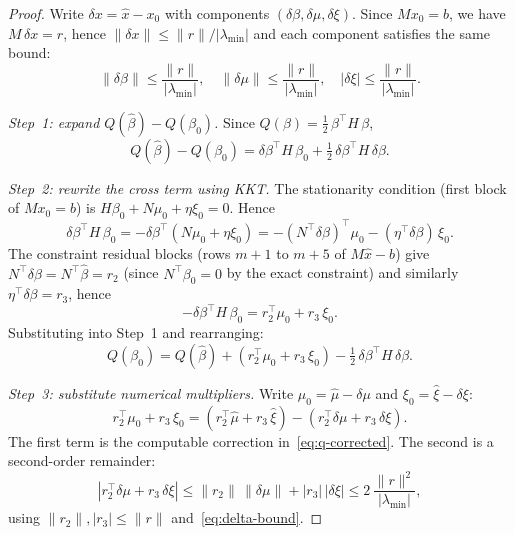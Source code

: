 \begin{proof}
Write $\delta x = \hat x - x_0$ with components
$(\delta\beta, \delta\mu, \delta\xi)$.
Since $M x_0 = b$, we have $M\,\delta x = r$,
hence $\|\delta x\| \leq \|r\| / |\lambda_{\min}|$ and
each component satisfies the same bound:
\begin{equation}\label{eq:delta-bound}
  \|\delta\beta\| \leq \frac{\|r\|}{|\lambda_{\min}|}, \quad
  \|\delta\mu\| \leq \frac{\|r\|}{|\lambda_{\min}|}, \quad
  |\delta\xi| \leq \frac{\|r\|}{|\lambda_{\min}|}.
\end{equation}

\emph{Step~1: expand $Q(\hat\beta) - Q(\beta_0)$.}
Since $Q(\beta) = \tfrac{1}{2}\,\beta^\top H\,\beta$,
\[
  Q(\hat\beta) - Q(\beta_0)
  = \delta\beta^\top H\,\beta_0
    + \tfrac{1}{2}\,\delta\beta^\top H\,\delta\beta.
\]

\emph{Step~2: rewrite the cross term using KKT.}
The stationarity condition (first block of $M x_0 = b$) is
$H\beta_0 + N\mu_0 + \eta\xi_0 = 0$.
Hence
\[
  \delta\beta^\top H\,\beta_0
  = -\delta\beta^\top(N\mu_0 + \eta\xi_0)
  = -(N^\top\delta\beta)^\top \mu_0
    - (\eta^\top\delta\beta)\,\xi_0.
\]
The constraint residual blocks
(rows $m{+}1$ to $m{+}5$ of $M\hat x - b$) give
$N^\top\delta\beta = N^\top\hat\beta = r_2$
(since $N^\top\beta_0 = 0$ by the exact constraint)
and similarly $\eta^\top\delta\beta = r_3$, hence
\begin{equation}\label{eq:cross-term}
  -\delta\beta^\top H\,\beta_0
  = r_2^\top\mu_0 + r_3\,\xi_0.
\end{equation}
Substituting into Step~1 and rearranging:
\begin{equation}\label{eq:q-expansion}
  Q(\beta_0) = Q(\hat\beta) + (r_2^\top\mu_0 + r_3\,\xi_0)
    - \tfrac{1}{2}\,\delta\beta^\top H\,\delta\beta.
\end{equation}

\emph{Step~3: substitute numerical multipliers.}
Write $\mu_0 = \hat\mu - \delta\mu$ and
$\xi_0 = \hat\xi - \delta\xi$:
\[
  r_2^\top\mu_0 + r_3\,\xi_0
  = (r_2^\top\hat\mu + r_3\,\hat\xi)
    - (r_2^\top\delta\mu + r_3\,\delta\xi).
\]
The first term is the computable correction
in~\eqref{eq:q-corrected}.
The second is a second-order remainder:
\begin{equation}\label{eq:substitution-remainder}
  |r_2^\top\delta\mu + r_3\,\delta\xi|
  \leq \|r_2\|\,\|\delta\mu\| + |r_3|\,|\delta\xi|
  \leq 2\,\frac{\|r\|^2}{|\lambda_{\min}|},
\end{equation}
using $\|r_2\|, |r_3| \leq \|r\|$
and~\eqref{eq:delta-bound}.


\end{proof}
